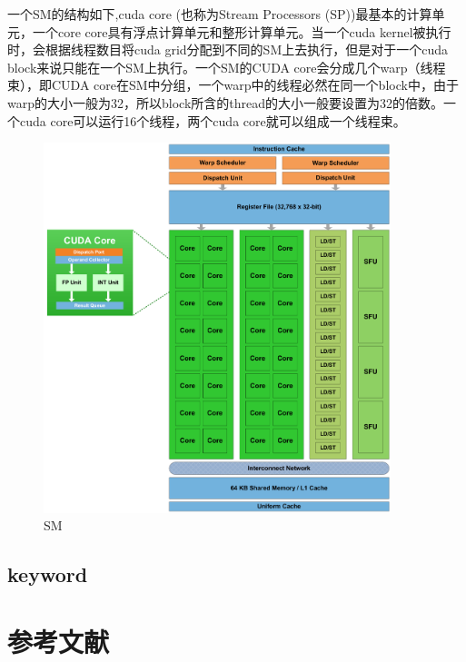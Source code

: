 \documentclass[12pt]{book}
\begin{document}
一个SM的结构如下,cuda core (也称为Stream Processors (SP))最基本的计算单元，一个core core具有浮点计算单元和整形计算单元。当一个cuda kernel被执行时，会根据线程数目将cuda grid分配到不同的SM上去执行，但是对于一个cuda block来说只能在一个SM上执行。一个SM的CUDA core会分成几个warp（线程束），即CUDA core在SM中分组，一个warp中的线程必然在同一个block中，由于warp的大小一般为32，所以block所含的thread的大小一般要设置为32的倍数。一个cuda core可以运行16个线程，两个cuda core就可以组成一个线程束。
\begin{figure}[H]
	\centering
	\includegraphics[width=0.9\textwidth]{images/cuda-one-sm.png}
	\caption{SM}
	\label{SM}
\end{figure}

\section{keyword}

\newpage
 
\fancyhead{}
 

 
\chapter{参考文献}


 
\end{document}
